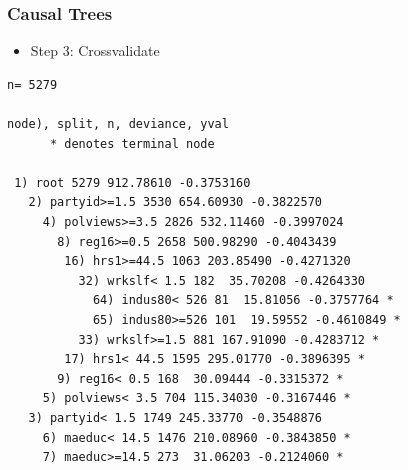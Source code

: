 \documentclass[
  shownotes,
  xcolor={svgnames},
  hyperref={colorlinks,citecolor=DarkBlue,linkcolor=DarkRed,urlcolor=DarkBlue}
  , aspectratio=169]{beamer}
\newenvironment{Shaded}{\begin{snugshade}}{\end{snugshade}}
\newcommand{\CommentTok}[1]{\textcolor[rgb]{0.56,0.35,0.01}{\textit{#1}}}
\newcommand{\DataTypeTok}[1]{\textcolor[rgb]{0.13,0.29,0.53}{#1}}
\newcommand{\KeywordTok}[1]{\textcolor[rgb]{0.13,0.29,0.53}{\textbf{#1}}}
\newcommand{\NormalTok}[1]{#1}
\newcommand{\OperatorTok}[1]{\textcolor[rgb]{0.81,0.36,0.00}{\textbf{#1}}}
\newcommand{\StringTok}[1]{\textcolor[rgb]{0.31,0.60,0.02}{#1}}
\begin{document}
\begin{frame}[fragile]
\frametitle{Causal Trees}

\begin{itemize}
\item Step 3: Crossvalidate
\end{itemize}

\begin{scriptsize}
\begin{Shaded}
\end{Shaded}
\end{scriptsize}

\begin{tiny}
\begin{verbatim}
n= 5279 

node), split, n, deviance, yval
      * denotes terminal node

 1) root 5279 912.78610 -0.3753160  
   2) partyid>=1.5 3530 654.60930 -0.3822570  
     4) polviews>=3.5 2826 532.11460 -0.3997024  
       8) reg16>=0.5 2658 500.98290 -0.4043439  
        16) hrs1>=44.5 1063 203.85490 -0.4271320  
          32) wrkslf< 1.5 182  35.70208 -0.4264330  
            64) indus80< 526 81  15.81056 -0.3757764 *
            65) indus80>=526 101  19.59552 -0.4610849 *
          33) wrkslf>=1.5 881 167.91090 -0.4283712 *
        17) hrs1< 44.5 1595 295.01770 -0.3896395 *
       9) reg16< 0.5 168  30.09444 -0.3315372 *
     5) polviews< 3.5 704 115.34030 -0.3167446 *
   3) partyid< 1.5 1749 245.33770 -0.3548876  
     6) maeduc< 14.5 1476 210.08960 -0.3843850 *
     7) maeduc>=14.5 273  31.06203 -0.2124060 *
\end{verbatim}

\end{tiny}

\end{frame}
\end{document}
